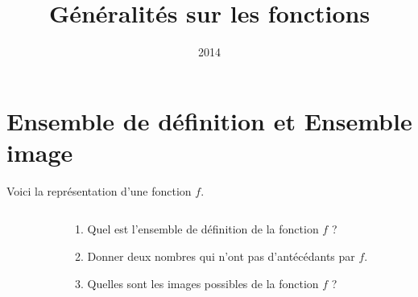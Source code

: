 \documentclass[14pt, aspectratio=169]{beamer}
\institute{Lycée Marie Curie}
\date{2014}
\title{Généralités sur les fonctions}
\begin{document}
\section{Ensemble de définition et Ensemble image}
\begin{frame}
  Voici la représentation d'une fonction $f$.
  \begin{columns}[T]
    \begin{column}{.5\textwidth}
    \end{column}
    \begin{column}{.5\textwidth}
      \begin{enumerate}
        \item Quel est l'ensemble de définition de la fonction $f$ ?
        \item Donner deux nombres qui n'ont pas d'antécédants par $f$.
        \item Quelles sont les images possibles de la fonction $f$ ?
      \end{enumerate}
    \end{column}
  \end{columns}
\end{frame}
\end{document}
